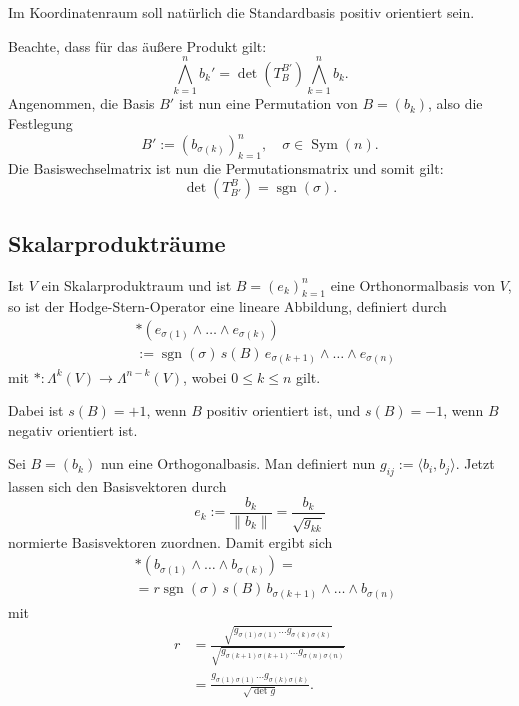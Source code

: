 \documentclass[a4paper,10pt,fleqn,twocolumn,twoside]{scrartcl}
\numberwithin{equation}{section}
\DeclareMathOperator{\sgn}{sgn}
\theoremstyle{rmbox}
\begin{document}
Im Koordinatenraum soll natürlich die Standardbasis positiv
orientiert sein.

Beachte, dass für das äußere Produkt gilt:
\begin{equation}
\bigwedge_{k=1}^n b_k' = \det(T_B^{B'}) \bigwedge_{k=1}^n b_k.
\end{equation}
Angenommen, die Basis $B'$ ist nun eine Permutation von $B=(b_k)$,
also die Festlegung
\begin{equation}
B' := (b_{\sigma(k)})_{k=1}^n, \quad \sigma\in\operatorname{Sym}(n).
\end{equation}
Die Basiswechselmatrix ist nun die Permutationsmatrix und somit gilt:
\begin{equation}
\det(T_{B'}^B) = \sgn(\sigma).
\end{equation}

\subsection{Skalarprodukträume}
Ist $V$ ein Skalarproduktraum und ist
$B=(e_k)_{k=1}^n$ eine Orthonormalbasis von $V$,
so ist der Hodge-Stern-Operator eine lineare Abbildung,
definiert durch%
\begin{equation}
\begin{split}
&*(e_{\sigma(1)}\wedge\ldots\wedge e_{\sigma(k)})\\
&:= \sgn(\sigma)\,s(B)\,e_{\sigma(k+1)}\wedge\ldots\wedge e_{\sigma(n)}
\end{split}
\end{equation}
mit $*\colon \Lambda^k(V)\to\Lambda^{n-k}(V)$,
wobei $0\le k\le n$ gilt.

Dabei ist $s(B)=+1$, wenn $B$ positiv orientiert ist,
und $s(B)=-1$, wenn $B$ negativ orientiert ist.

Sei $B=(b_k)$ nun eine Orthogonalbasis. Man definiert nun
$g_{ij}:=\langle b_i,b_j\rangle$. Jetzt lassen sich den
Basisvektoren durch
\begin{equation}
e_k := \frac{b_k}{\|b_k\|} = \frac{b_k}{\sqrt{g_{kk}}}
\end{equation}
normierte Basisvektoren zuordnen. Damit ergibt sich
\begin{equation}
\begin{split}
&*(b_{\sigma(1)}\wedge\ldots\wedge b_{\sigma(k)}) =\\
&= r \sgn(\sigma)\,s(B)\,b_{\sigma(k+1)}\wedge\ldots\wedge b_{\sigma(n)}
\end{split}
\end{equation}
mit
\begin{equation}
\begin{split}
r &= \frac{\sqrt{g_{\sigma(1)\sigma(1)}\ldots g_{\sigma(k)\sigma(k)}}}
{\sqrt{g_{\sigma(k+1)\sigma(k+1)}\ldots g_{\sigma(n)\sigma(n)}}}\\
&=\frac{g_{\sigma(1)\sigma(1)}\ldots g_{\sigma(k)\sigma(k)}}{\sqrt{\det g}}.
\end{split}
\end{equation}
\end{document}
